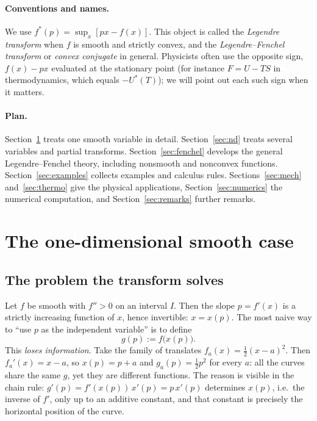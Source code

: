 \documentclass[11pt,a4paper]{article}
\theoremstyle{plain}
\theoremstyle{definition}
\theoremstyle{remark}
\begin{document}
\paragraph{Conventions and names.}
We use $f^*(p)=\sup_x[px-f(x)]$.  This object is called the
\emph{Legendre transform} when $f$ is smooth and strictly convex, and the
\emph{Legendre--Fenchel transform} or \emph{convex conjugate} in general.
Physicists often use the opposite sign, $f(x)-px$ evaluated at the stationary
point (for instance $F=U-TS$ in thermodynamics, which equals $-U^*(T)$); we
will point out each such sign when it matters.

\paragraph{Plan.}
Section~\ref{sec:1d} treats one smooth variable in detail.
Section~\ref{sec:nd} treats several variables and partial transforms.
Section~\ref{sec:fenchel} develops the general Legendre--Fenchel theory,
including nonsmooth and nonconvex functions.
Section~\ref{sec:examples} collects examples and calculus rules.
Sections~\ref{sec:mech} and~\ref{sec:thermo} give the physical applications,
Section~\ref{sec:numerics} the numerical computation, and
Section~\ref{sec:remarks} further remarks.

\section{The one-dimensional smooth case}\label{sec:1d}

\subsection{The problem the transform solves}

Let $f$ be smooth with $f''>0$ on an interval $I$.  Then the slope
$p=f'(x)$ is a strictly increasing function of $x$, hence invertible:
$x=x(p)$.  The most naive way to ``use $p$ as the independent variable'' is
to define
\[
  g(p):=f\bigl(x(p)\bigr).
\]
This \emph{loses information}.  Take the family of translates
$f_a(x)=\tfrac12(x-a)^2$.  Then $f_a'(x)=x-a$, so $x(p)=p+a$ and
$g_a(p)=\tfrac12 p^2$ for every $a$: all the curves share the same $g$, yet
they are different functions.  The reason is visible in the chain rule:
$g'(p)=f'(x(p))\,x'(p)=p\,x'(p)$ determines $x(p)$, i.e.\ the inverse of
$f'$, only up to an additive constant, and that constant is precisely the
horizontal position of the curve.
\end{document}
